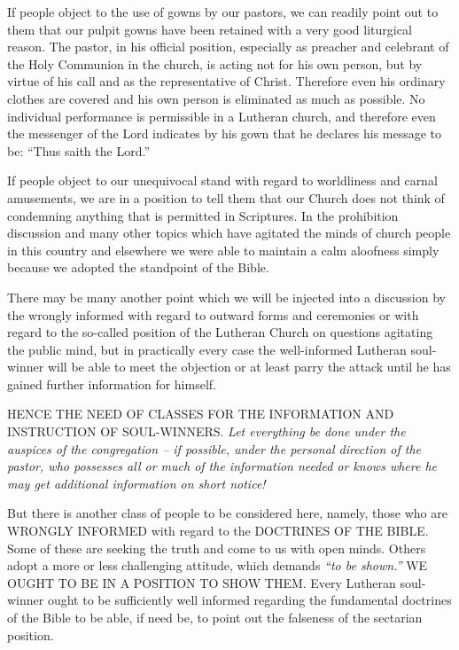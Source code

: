 \documentclass[
]{book}
\begin{document}
If people object to the use of gowns by our pastors, we can readily point out to them that our pulpit gowns have been retained with a very good liturgical reason. The pastor, in his official position, especially as preacher and celebrant of the Holy Communion in the church, is acting not for his own person, but by virtue of his call and as the representative of Christ. Therefore even his ordinary clothes are covered and his own person is eliminated as much as possible. No individual performance is permissible in a Lutheran church, and therefore even the messenger of the Lord indicates by his gown that he declares his message to be: ``Thus saith the Lord.''

If people object to our unequivocal stand with regard to worldliness and carnal amusements, we are in a position to tell them that our Church does not think of condemning anything that is permitted in Scriptures. In the prohibition discussion and many other topics which have agitated the minds of church people in this country and elsewhere we were able to maintain a calm aloofness simply because we adopted the standpoint of the Bible.

There may be many another point which we will be injected into a discussion by the wrongly informed with regard to outward forms and ceremonies or with regard to the so-called position of the Lutheran Church on questions agitating the public mind, but in practically every case the well-informed Lutheran soul-winner will be able to meet the objection or at least parry the attack until he has gained further information for himself.

HENCE THE NEED OF CLASSES FOR THE INFORMATION AND INSTRUCTION OF SOUL-WINNERS. \emph{Let everything be done under the auspices of the congregation -- if possible, under the personal direction of the pastor, who possesses all or much of the information needed or knows where he may get additional information on short notice!}

But there is another class of people to be considered here, namely, those who are WRONGLY INFORMED with regard to the DOCTRINES OF THE BIBLE. Some of these are seeking the truth and come to us with open minds. Others adopt a more or less challenging attitude, which demands \emph{``to be shown.''} WE OUGHT TO BE IN A POSITION TO SHOW THEM. Every Lutheran soul-winner ought to be sufficiently well informed regarding the fundamental doctrines of the Bible to be able, if need be, to point out the falseness of the sectarian position.
\end{document}
